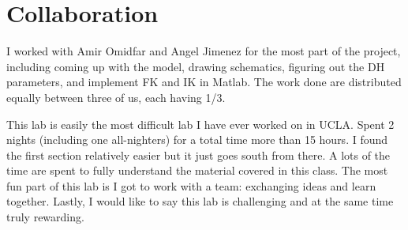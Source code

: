\documentclass[12pt, letterpaper]{amsart} %
\numberwithin{equation}{section}
\begin{document}
\section{Collaboration}
I worked with Amir Omidfar and Angel Jimenez for the most part of the project, including coming up with the model, drawing schematics, figuring out the DH parameters, and implement FK and IK in Matlab. The work done are distributed equally between three of us, each having 1/3. \par
This lab is easily the most difficult lab I have ever worked on in UCLA. Spent 2 nights (including one all-nighters) for a total time more than 15 hours. I found the first section relatively easier but it just goes south from there. A lots of the time are spent to fully understand the material covered in this class. The most fun part of this lab is I got to work with a team: exchanging ideas and learn together. Lastly, I would like to say this lab is challenging and at the same time truly rewarding.
\end{document}
